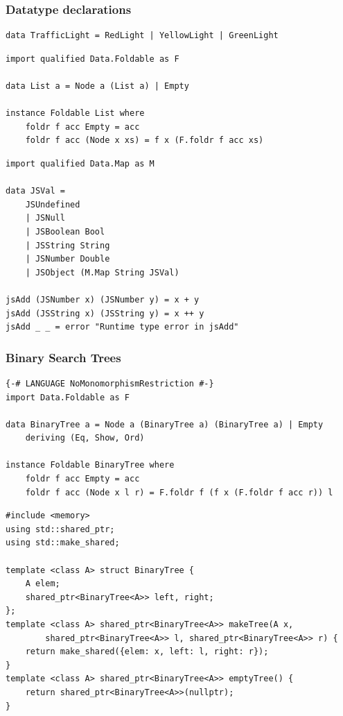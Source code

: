 \documentclass{beamer}
\begin{document}
\begin{frame}[fragile]
\frametitle{Datatype declarations}
\begin{Verbatim}[frame=single, fontsize=\scriptsize]
data TrafficLight = RedLight | YellowLight | GreenLight
\end{Verbatim}
\begin{Verbatim}[frame=single, fontsize=\scriptsize]
import qualified Data.Foldable as F

data List a = Node a (List a) | Empty

instance Foldable List where
    foldr f acc Empty = acc
    foldr f acc (Node x xs) = f x (F.foldr f acc xs)
\end{Verbatim}
\begin{Verbatim}[frame=single, fontsize=\scriptsize]
import qualified Data.Map as M

data JSVal =
    JSUndefined
    | JSNull
    | JSBoolean Bool
    | JSString String
    | JSNumber Double
    | JSObject (M.Map String JSVal)

jsAdd (JSNumber x) (JSNumber y) = x + y
jsAdd (JSString x) (JSString y) = x ++ y
jsAdd _ _ = error "Runtime type error in jsAdd"
\end{Verbatim}
\end{frame}

\begin{frame}[fragile]
\frametitle{Binary Search Trees}
\begin{Verbatim}[frame=single, fontsize=\scriptsize]
{-# LANGUAGE NoMonomorphismRestriction #-}
import Data.Foldable as F

data BinaryTree a = Node a (BinaryTree a) (BinaryTree a) | Empty
    deriving (Eq, Show, Ord)

instance Foldable BinaryTree where
    foldr f acc Empty = acc
    foldr f acc (Node x l r) = F.foldr f (f x (F.foldr f acc r)) l
\end{Verbatim}
\begin{Verbatim}[frame=single, fontsize=\scriptsize]
#include <memory>
using std::shared_ptr;
using std::make_shared;

template <class A> struct BinaryTree {
    A elem;
    shared_ptr<BinaryTree<A>> left, right;
};
template <class A> shared_ptr<BinaryTree<A>> makeTree(A x,
        shared_ptr<BinaryTree<A>> l, shared_ptr<BinaryTree<A>> r) {
    return make_shared({elem: x, left: l, right: r});
}
template <class A> shared_ptr<BinaryTree<A>> emptyTree() {
    return shared_ptr<BinaryTree<A>>(nullptr);
}
\end{Verbatim}
\end{frame}
\end{document}
